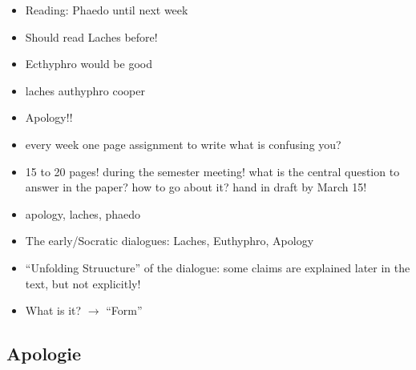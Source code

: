 \documentclass[emulatestandardclasses]{scrartcl}
\begin{document}
\begin{itemize}
  \item Reading: Phaedo until next week
  \item Should read Laches before!
  \item Ecthyphro would be good 
  \item laches authyphro cooper
  \item Apology!!
  \item every week one page assignment to write what is confusing you?
  \item 15 to 20 pages! during the semester meeting! what is the central question to answer in the paper? how to go about it? hand in draft by March 15!
  \item apology, laches, phaedo 
  \item The early/Socratic dialogues: Laches, Euthyphro, Apology
  \item "`Unfolding Struucture"' of the dialogue: some claims are explained later in the text, but not explicitly!
  \item What is it? $\rightarrow$ "`Form"' 
\end{itemize}


\subsection{Apologie}
\end{document}
